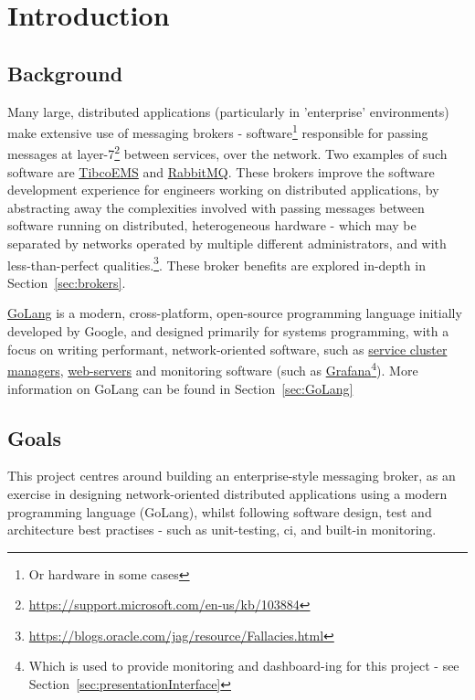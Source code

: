 \chapter{Introduction}
\label{chap:Introduction}

\section{Background}
\label{sec:background}

Many large, distributed applications (particularly in 'enterprise' environments)
make extensive use of messaging brokers - software\footnote{Or hardware in some
cases\cite{solaceappliances}} responsible for passing messages at
layer-7\footnote{\url{https://support.microsoft.com/en-us/kb/103884}} between
services, over the network. Two examples of such software are
\href{http://www.tibco.com/products/automation/enterprise-messaging/enterprise-message-service}{TibcoEMS}
and \href{https://www.rabbitmq.com/}{RabbitMQ}. These brokers improve the
software development experience for engineers working on distributed
applications, by abstracting away the complexities involved with passing
messages between software running on distributed, heterogeneous hardware - which
may be separated by networks operated by multiple different administrators, and
with less-than-perfect
qualities.\footnote{\url{https://blogs.oracle.com/jag/resource/Fallacies.html}}.
These broker benefits are explored in-depth in Section~\ref{sec:brokers}.

\href{https://golang.org/}{GoLang} is a modern, cross-platform, open-source
programming language initially developed by Google, and designed primarily for
systems programming, with a focus on writing performant, network-oriented
software, such as \href{https://github.com/kubernetes/kubernetes}{service
cluster managers}, \href{https://github.com/mholt/caddy}{web-servers} and
monitoring software (such as
\href{https://github.com/grafana/grafana}{Grafana}\footnote{Which is used to
provide monitoring and dashboard-ing for this project - see
Section~\ref{sec:presentationInterface}}). More information on GoLang can be
found in Section~\ref{sec:GoLang}

\section{Goals}
This project centres around building an enterprise-style messaging broker, as an
exercise in designing network-oriented distributed applications using a modern
programming language (GoLang), whilst following software design, test and
architecture best practises - such as unit-testing, \gls{ci}, and
built-in monitoring.

